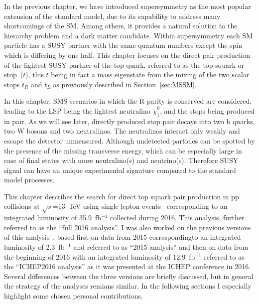\clearpage

\setcounter{secnumdepth}{4}
\setcounter{secnumdepth}{4}


In the previous chapter, we have introduced  supersymmetry as the most popular extension of the standard model, due to its capability to address many shortcomings of the SM. Among others, it provides a natural solution to the hierarchy problem and a dark matter candidate. Within supersymmetry each SM particle has a SUSY partner with the same quantum numbers except the spin which is differing by one half. This chapter focuses on the direct pair production of the lightest SUSY partner of the top quark, referred to as the top squark or stop~($\tilde{t}$), this $\tilde{t}$ being in fact a mass eigenstate  from the mixing of the two scalar stops $\tilde{t}_{R}$ and  $\tilde{t}_{L}$ as previously described in Section~\ref{sec:MSSM}.


In this chapter, SMS scenarios in which the R-parity is conserved are considered, leading to the LSP being the lightest neutralino $\tilde{\chi}^{0}_{1}$, and the stops being produced in pair. As we will see later, directly produced stop pair decays into two b quarks, two W bosons and two neutralinos. The neutralinos interact only weakly and escape the detector unmeasured. Although undetected particles can be spotted by the presence of the missing transverse energy, which can be especially large in case of final states with more neutralino(s) and neutrino(s). Therefore SUSY signal can have an unique experimental signature compared to the standard model processes.

This chapter describes the search for direct top squark pair production in pp collisions at $\sqrt{s}$=13~TeV using single lepton events~\cite{Sirunyan:2017xse} corresponding to an integrated luminosity of 35.9~fb$^{-1}$ collected during 2016. This analysis, further referred to as the ``full 2016 analysis''.  I was also worked on the previous versions of this analysis~\cite{Sirunyan:2016jpr, CMS:2016vew}, based first on data from 2015 correspondingto an integrated luminosity of 2.3~fb$^{-1}$ and referred to as ``2015 analysis'' and then on data from the beginning of 2016 with an integrated luminosity of 12.9~fb$^{-1}$ referred to as the ``ICHEP2016 analysis'' as it was presented at the ICHEP conference in 2016. Several differences between the three versions are briefly discussed, but in general the strategy of the analyses remians similar. In the following sections I especially highlight some chosen personal contributions.

